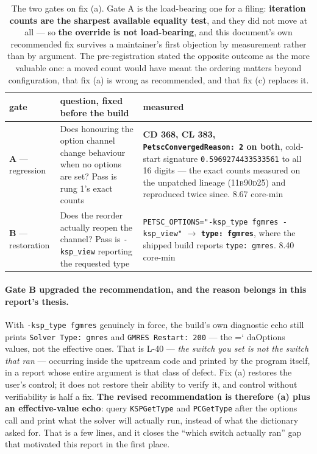 \documentclass[11pt,a4paper]{article}
\newcommand{\artifact}[1]{{\small\ttfamily\hyphenchar\font=`\-\relax
  \def\_{\textunderscore\allowbreak}#1}}
\newcommand{\commit}[1]{\textsc{\small #1}}
\begin{document}
\begin{table}[htbp]
\centering\footnotesize
\begin{tabular}{@{}L{2.0cm}L{5.4cm}L{7.0cm}@{}}
\toprule
gate & question, fixed before the build & measured \\
\midrule
\textbf{A} --- regression & Does honouring the option channel change behaviour when no options are set? Pass is rung 1's exact counts & \textbf{CD 368, CL 383, \texttt{PetscConvergedReason: 2} on both}, cold-start signature \texttt{0.5969274433533561} to all 16 digits --- the exact counts measured on the unpatched lineage (\commit{11b90d25}) and reproduced twice since. 8.67 core-min \\
\addlinespace
\textbf{B} --- restoration & Does the reorder actually reopen the channel? Pass is \texttt{-ksp\_view} reporting the requested type & \texttt{PETSC\_OPTIONS="-ksp\_type fgmres -ksp\_view"} \(\rightarrow\) \textbf{\texttt{type: fgmres}}, where the shipped build reports \texttt{type: gmres}. 8.40 core-min \\
\bottomrule
\end{tabular}
\caption{The two gates on fix (a). Gate A is the load-bearing one for a filing: \textbf{iteration
counts are the sharpest available equality test}, and they did not move at all --- so
\textbf{the override is not load-bearing}, and this document's own recommended fix survives a
maintainer's first objection by measurement rather than by argument. The pre-registration stated
the opposite outcome as the more valuable one: a moved count would have meant the ordering matters
beyond configuration, that fix (a) is wrong as recommended, and that fix (c) replaces it.}
\label{tab:kspgates}
\end{table}

\paragraph{Gate B upgraded the recommendation, and the reason belongs in this report's thesis.}
With \texttt{-ksp\_type fgmres} genuinely in force, the build's own diagnostic echo still prints
\texttt{Solver Type: gmres} and \texttt{GMRES Restart: 200} --- the \artifact{daOptions} values,
not the effective ones. That is L-40 --- \emph{the switch you set is not the switch that ran} ---
occurring inside the upstream code and printed by the program itself, in a report whose entire
argument is that class of defect. Fix (a) restores the user's control; it does not restore their
ability to verify it, and control without verifiability is half a fix. \textbf{The revised
recommendation is therefore (a) plus an effective-value echo}: query \texttt{KSPGetType} and
\texttt{PCGetType} after the options call and print what the solver will actually run, instead of
what the dictionary asked for. That is a few lines, and it closes the ``which switch actually
ran'' gap that motivated this report in the first place.
\end{document}
